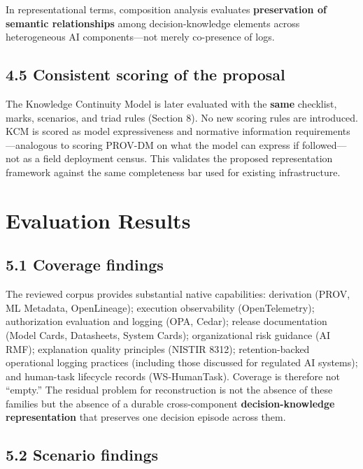 \documentclass[11pt,a4paper]{article}
\begin{document}
In representational terms, composition analysis evaluates \textbf{preservation of semantic relationships} among decision-knowledge elements across heterogeneous AI components---not merely co-presence of logs.


\subsection{4.5 Consistent scoring of the proposal}

The Knowledge Continuity Model is later evaluated with the \textbf{same} checklist, marks, scenarios, and triad rules (Section 8). No new scoring rules are introduced. KCM is scored as model expressiveness and normative information requirements---analogous to scoring PROV-DM on what the model can express if followed---not as a field deployment census. This validates the proposed representation framework against the same completeness bar used for existing infrastructure.



\section{Evaluation Results}

\subsection{5.1 Coverage findings}

The reviewed corpus provides substantial native capabilities: derivation (PROV, ML Metadata, OpenLineage); execution observability (OpenTelemetry); authorization evaluation and logging (OPA, Cedar); release documentation (Model Cards, Datasheets, System Cards); organizational risk guidance (AI RMF); explanation quality principles (NISTIR 8312); retention-backed operational logging practices (including those discussed for regulated AI systems); and human-task lifecycle records (WS-HumanTask). Coverage is therefore not ``empty.'' The residual problem for reconstruction is not the absence of these families but the absence of a durable cross-component \textbf{decision-knowledge representation} that preserves one decision episode across them.


\subsection{5.2 Scenario findings}
\end{document}
